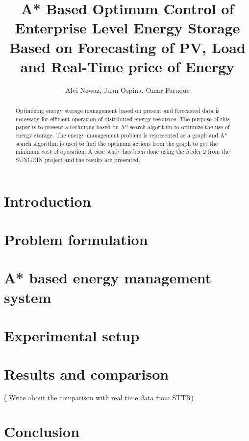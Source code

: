 \documentclass[journal]{IEEEtran}
\begin{document}
\title{A* Based Optimum Control of Enterprise Level Energy Storage Based on Forecasting of PV, Load and Real-Time price of Energy}

\author{Alvi Newaz, Juan Ospina, Omar Faruque}






\maketitle                                                               

\begin{abstract}
Optimizing energy storage management based on present and forecasted data is necessary for efficient operation of distributed energy resources. The purpose of this paper is to present a technique based on A* search algorithm \cite{a8book} to optimize the use of energy storage. The energy management problem is represented as a graph and A* search algorithm is used to find the optimum actions from the graph to get the minimum cost of operation. A case study has been done using the feeder 2 from the SUNGRIN project \cite{SUNGRIN} and the results are presented.


\end{abstract}



\IEEEpeerreviewmaketitle



\section{Introduction}


\section{Problem formulation}


\section{A* based energy management system}




\section{Experimental setup}


\section{Results and comparison}

( Write about the comparison with real time data from STTR)

\section{Conclusion}




\ifCLASSOPTIONcaptionsoff
  \newpage
\fi
\end{document}
